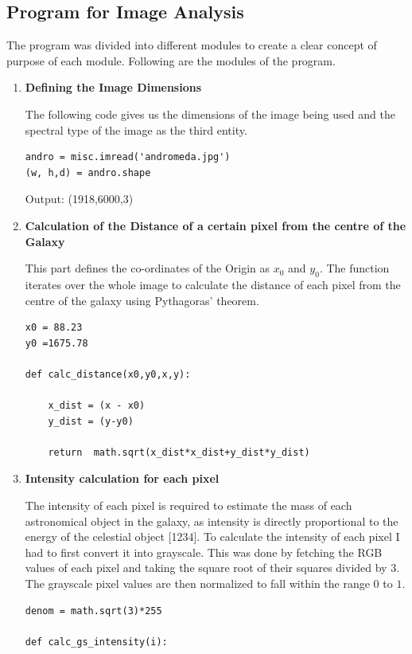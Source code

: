 \subsection{Program for Image Analysis}
The program was divided into different modules to create a clear concept of purpose of each module. Following are the modules of the program.
\begin{enumerate}
\item \textbf{Defining the Image Dimensions}

The following code gives us the dimensions of the image being used and the spectral type of the image as the third entity.

\begin{verbatim}
andro = misc.imread('andromeda.jpg')
(w, h,d) = andro.shape
\end{verbatim}

Output: (1918,6000,3)


\item \textbf{Calculation of the Distance of a certain pixel from the centre of the Galaxy}

This part defines the co-ordinates of the Origin as $x_{0}$ and $y_{0}$. The function iterates over the whole image to calculate the distance of each pixel from the centre of the galaxy using Pythagoras' theorem.

\begin{verbatim}
x0 = 88.23
y0 =1675.78

def calc_distance(x0,y0,x,y):

    x_dist = (x - x0)
    y_dist = (y-y0)

    return  math.sqrt(x_dist*x_dist+y_dist*y_dist)
\end{verbatim}

\item \textbf{Intensity calculation for each pixel}

The intensity of each pixel is required to estimate the mass of each astronomical object in the galaxy, as intensity is directly proportional to the energy of the celestial object [1234]. To calculate the intensity of each pixel I had to first convert it into grayscale. This was done by fetching the RGB values of each pixel and taking the square root of their squares divided by $3$. The grayscale pixel values are then normalized to fall within the range $0$ to $1$. 
\begin{verbatim}
denom = math.sqrt(3)*255

def calc_gs_intensity(i):


\end{verbatim}
\end{enumerate}
